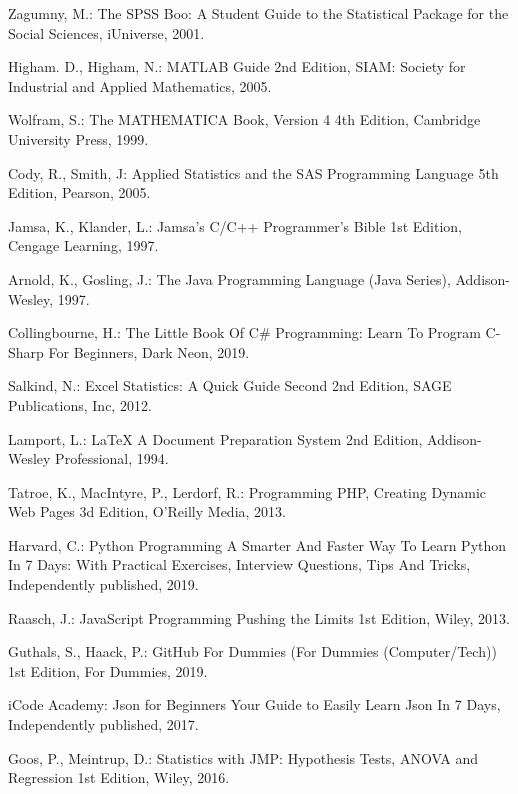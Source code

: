 \documentclass[runningheads,14pt,a4paper,openany]{book}
\begin{document}
\newpage
\begin{thebibliography}{99}

 Zagumny, M.: The SPSS Boo: A Student Guide to the Statistical Package for the Social Sciences, iUniverse, 2001.

 Higham. D., Higham, N.: MATLAB Guide 2nd Edition, SIAM: Society for Industrial and Applied Mathematics, 2005.

 Wolfram, S.: The MATHEMATICA Book, Version 4 4th Edition, Cambridge University Press, 1999.

 Cody, R., Smith, J: Applied Statistics and the SAS Programming Language 5th Edition, Pearson, 2005.

 Jamsa, K., Klander, L.: Jamsa's C/C++ Programmer's Bible 1st Edition, Cengage Learning, 1997.

 Arnold, K.,  Gosling, J.: The Java Programming Language (Java Series), Addison-Wesley, 1997.

 Collingbourne, H.: The Little Book Of C\# Programming: Learn To Program C-Sharp For Beginners, Dark Neon, 2019.

 Salkind, N.: Excel Statistics: A Quick Guide Second 2nd Edition, SAGE Publications, Inc, 2012.

 Lamport, L.: LaTeX A Document Preparation System 2nd Edition, Addison-Wesley Professional, 1994.

 Tatroe, K., MacIntyre, P., Lerdorf, R.: Programming PHP, Creating Dynamic Web Pages 3d Edition, O'Reilly Media, 2013.

 Harvard, C.: Python Programming A Smarter And Faster Way To Learn Python In 7 Days: With Practical Exercises, Interview Questions, Tips And Tricks, Independently published, 2019.

 Raasch, J.: JavaScript Programming Pushing the Limits 1st Edition, Wiley, 2013.

 Guthals, S., Haack, P.: GitHub For Dummies (For Dummies (Computer/Tech)) 1st Edition, For Dummies, 2019.

 iCode Academy: Json for Beginners Your Guide to Easily Learn Json In 7 Days, Independently published, 2017.

 Goos, P., Meintrup, D.: Statistics with JMP: Hypothesis Tests, ANOVA and Regression 1st Edition, Wiley, 2016. 


\end{thebibliography}
\end{document}
